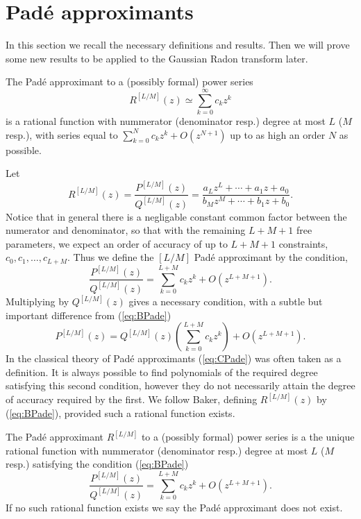 \section{Pad\'e approximants}

In this section we recall the necessary definitions and results. Then we will prove some new results to be applied to the Gaussian Radon transform later.

\begin{definition}
  The Pad\'e approximant to a (possibly formal) power series 
  \[
    R^{[L/M]}(z) \simeq \sum_{k=0}^\infty c_k z^k
  \]
  is a rational function with nummerator (denominator resp.) degree at most $L$ ($M$ resp.), with series equal to $\sum_{k=0}^N c_k z^k + O(z^{N+1})$ up to as high an order $N$ as possible. 
\end{definition}

Let
\[
  R^{[L/M]}(z) = \frac{P^{[L/M]}(z)}{Q^{[L/M]}(z)} = \frac{a_L z^L + \cdots + a_1z + a_0}{b_M z^M + \cdots + b_1z + b_0}.
\]
Notice that in general there is a negligable constant common factor between the numerator and denominator, so that with the remaining $L+M+1$ free parameters, we expect an order of accuracy of up to $L+M+1$ constraints, $c_0, c_1, \ldots, c_{L+M}$. Thus we define the $[L/M]$ Pad\'e approximant by the condition,
\begin{equation}
  \label{eq:BPade}
  \frac{P^{[L/M]}(z)}{Q^{[L/M]}(z)} = \sum_{k=0}^{L+M} c_k z^k + O\left(z^{L+M+1}\right).
\end{equation}
Multiplying by $Q^{[L/M]}(z)$ gives a necessary condition, with a subtle but important difference from (\ref{eq:BPade})
\begin{equation}
  \label{eq:CPade}
  P^{[L/M]}(z) = Q^{[L/M]}(z)\left(\sum_{k=0}^{L+M} c_k z^k\right) + O\left(z^{L+M+1}\right).
\end{equation}
In the classical theory of Pad\'e approximants (\ref{eq:CPade}) was often taken as a definition. It is always possible to find polynomials of the required degree satisfying this second condition, however they do not necessarily attain the degree of accuracy required by the first. We follow Baker, defining $R^{[L/M]}(z)$ by (\ref{eq:BPade}), provided such a rational function exists.

\begin{definition}
  The Pad\'e approximant $R^{[L/M]}$ to a (possibly formal) power series is a the unique rational function with nummerator (denominator resp.) degree at most $L$ ($M$ resp.) satisfying the condition 
  (\ref{eq:BPade})
  \[
  \frac{P^{[L/M]}(z)}{Q^{[L/M]}(z)} = \sum_{k=0}^{L+M} c_k z^k + O\left(z^{L+M+1}\right).
  \] 
  If no such rational function exists we say the Pad\'e approximant does not exist.
\end{definition}

